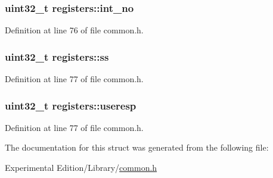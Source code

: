 \subsubsection[{\texorpdfstring{int\+\_\+no}{int_no}}]{\setlength{\rightskip}{0pt plus 5cm}uint32\+\_\+t registers\+::int\+\_\+no}\hypertarget{structregisters_af311750a9b18afb3b1ed2d144fbe1cb0}{}\label{structregisters_af311750a9b18afb3b1ed2d144fbe1cb0}


Definition at line 76 of file common.\+h.

\subsubsection[{\texorpdfstring{ss}{ss}}]{\setlength{\rightskip}{0pt plus 5cm}uint32\+\_\+t registers\+::ss}\hypertarget{structregisters_a0da8015246d96b8dcebe98c945fd3d61}{}\label{structregisters_a0da8015246d96b8dcebe98c945fd3d61}


Definition at line 77 of file common.\+h.

\subsubsection[{\texorpdfstring{useresp}{useresp}}]{\setlength{\rightskip}{0pt plus 5cm}uint32\+\_\+t registers\+::useresp}\hypertarget{structregisters_ad4734529e5faf04f6c61cfabfe4324e9}{}\label{structregisters_ad4734529e5faf04f6c61cfabfe4324e9}


Definition at line 77 of file common.\+h.



The documentation for this struct was generated from the following file\+:\begin{DoxyCompactItemize}
\item 
Experimental Edition/\+Library/\hyperlink{common_8h}{common.\+h}\end{DoxyCompactItemize}

